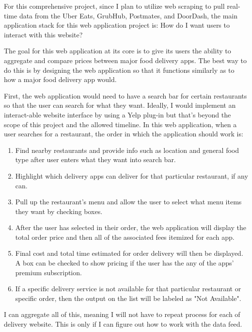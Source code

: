 \documentclass[10pt,twocolumn]{article}
\begin{document}
For this comprehensive project, since I plan to utilize web scraping to pull real-time data from the Uber Eats, GrubHub, Postmates, and DoorDash, the main application stack for this web application project is: How do I want users to interact with this website? 

The goal for this web application at its core is to give its users the ability to aggregate and compare prices between major food delivery apps. The best way to do this is by designing the web application so that it functions similarly as to how a major food delivery app would.

First, the web application would need to have a search bar for certain restaurants so that the user can search for what they want. Ideally, I would implement an interact-able website interface by using a Yelp plug-in but that's beyond the scope of this project and the allowed timeline. In this web application, when a user searches for a restaurant, the order in which the application should work is:

\begin{enumerate}[label=(\Alph*)]
\item Find nearby restaurants and provide info such as location and general food type after user enters what they want into search bar.
\item Highlight which delivery apps can deliver for that particular restaurant, if any can.
\item Pull up the restaurant's menu and allow the user to select what menu items they want by checking boxes.
\item After the user has selected in their order, the web application will display the total order price and then all of the associated fees itemized for each app.
\item Final cost and total time estimated for order delivery will then be displayed. A box can be checked to show pricing if the user has the any of the apps' premium subscription.
\item If a specific delivery service is not available for that particular restaurant or specific order, then the output on the list will be labeled as "Not Available".
\end{enumerate}

I can aggregate all of this, meaning I will not have to repeat process for each of delivery website. This is only if I can figure out how to work with the data feed. 
\end{document}
